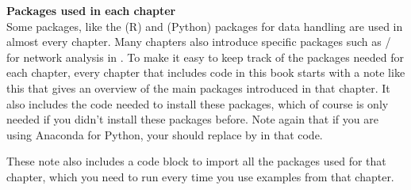 \begin{feature}
\textbf{Packages used in each chapter}\\
Some packages, like the  (R) and  (Python) packages for data handling are used in almost every chapter.
Many chapters also introduce specific packages such as / for network analysis in .
To make it easy to keep track of the packages needed for each chapter,
every chapter that includes code in this book starts with a note like this that gives an overview of the main packages introduced in that chapter.
It also includes the code needed to install these packages, which of course is only needed if you didn't install these packages before.
Note again that if you are using Anaconda for Python,
your should replace  by  in that code.

These note also includes a code block to import all the packages used for that chapter,
which you need to run every time you use examples from that chapter.
\end{feature}
